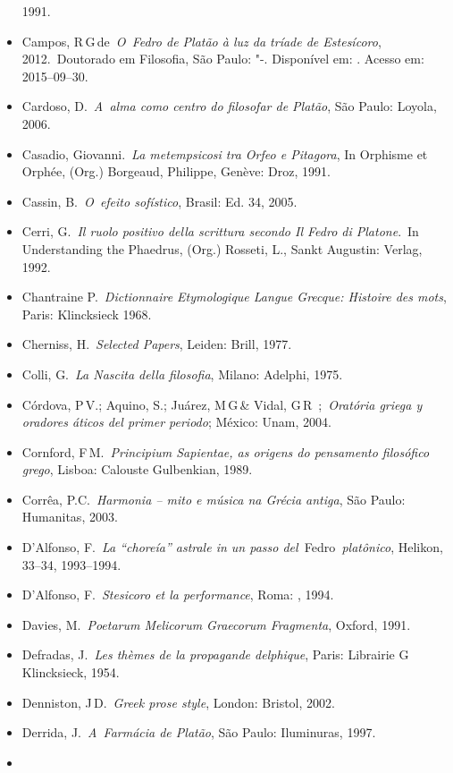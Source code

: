 \begin{itemize}
  1991.
\item
  Campos, R\,G\,de~\emph{O~Fedro de Platão à luz da tríade de
  Estesícoro}, 2012.~Doutorado em Filosofia, São Paulo: "-.
  Disponível em: . Acesso em: 2015--09--30.
\item
  Cardoso, D.~\emph{A~alma como centro do filosofar de Platão}, São
  Paulo: Loyola, 2006.
\item
  Casadio, Giovanni.~\emph{La metempsicosi tra Orfeo e Pitagora}, In
  Orphisme et Orphée, (Org.) Borgeaud, Philippe, Genève: Droz, 1991.
\item
  Cassin, B.~\emph{O~efeito sofístico}, Brasil: Ed. 34, 2005.
\item
  Cerri, G.~\emph{Il ruolo positivo della scrittura secondo Il Fedro di
  Platone}.~In Understanding the Phaedrus, (Org.) Rosseti, L., Sankt
  Augustin: Verlag, 1992.
\item
  Chantraine P.~\emph{Dictionnaire Etymologique Langue Grecque: Histoire
  des mots}, Paris: Klincksieck 1968.
\item
  Cherniss, H.~\emph{Selected Papers}, Leiden: Brill, 1977.
\item
  Colli, G.~\emph{La Nascita della filosofia}, Milano: Adelphi, 1975.
\item
  Córdova, P\,V.; Aquino, S.; Juárez, M\,G\,\& Vidal, G\,R\,  ;~\emph{Oratória griega y oradores áticos del primer periodo}; México:
  Unam, 2004.
\item
  Cornford, F\,M.~\emph{Principium Sapientae, as origens do pensamento
  filosófico grego}, Lisboa: Calouste Gulbenkian, 1989.
\item
  Corrêa, P.C.~\emph{Harmonia -- mito e música na Grécia antiga}, São
  Paulo: Humanitas, 2003.
\item
  D'Alfonso, F.~\emph{La ``choreía'' astrale in un passo
  del~}Fedro\emph{~platônico}, Helikon, 33--34, 1993--1994.
\item
  D'Alfonso, F.~\emph{Stesicoro et la performance}, Roma: , 1994.
\item
  Davies, M.~\emph{Poetarum Melicorum Graecorum Fragmenta}, Oxford,
  1991.
\item
  Defradas, J.~\emph{Les thèmes de la propagande delphique}, Paris:
  Librairie G\,Klincksieck, 1954.
\item
  Denniston, J\,D.~\emph{Greek prose style}, London: Bristol, 2002.
\item
  Derrida, J.~\emph{A~Farmácia de Platão}, São Paulo: Iluminuras, 1997.
\item

\end{itemize}
